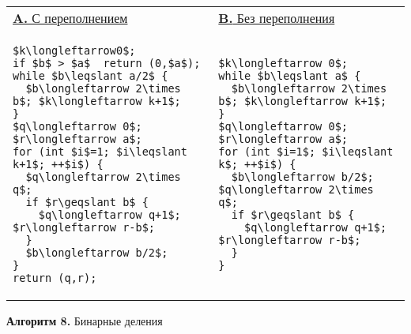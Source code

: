 \begin{center}
\begin{tabular}{|l|l|}
\hline
\hspace*{28pt}\underline{\textbf{A.} С переполнением}
&
\hspace*{23pt}\underline{\textbf{B.} Без переполнения}\\
{\begin{lstlisting}[mathescape=true, frame=none]
$k\longleftarrow0$;
if $b$ > $a$  return (0,$a$);
while $b\leqslant a/2$ {
  $b\longleftarrow 2\times b$; $k\longleftarrow k+1$;
}
$q\longleftarrow 0$; $r\longleftarrow a$;
for (int $i$=1; $i\leqslant k+1$; ++$i$) {
  $q\longleftarrow 2\times q$;
  if $r\geqslant b$ {
    $q\longleftarrow q+1$; $r\longleftarrow r-b$;
  }
  $b\longleftarrow b/2$;
}
return (q,r);
\end{lstlisting}}
&
{\begin{lstlisting}[mathescape=true, frame=none]
$k\longleftarrow 0$;
while $b\leqslant a$ {
  $b\longleftarrow 2\times b$; $k\longleftarrow k+1$;
}
$q\longleftarrow 0$; $r\longleftarrow a$;
for (int $i=1$; $i\leqslant k$; ++$i$) {
  $b\longleftarrow b/2$; $q\longleftarrow 2\times q$;
  if $r\geqslant b$ {
    $q\longleftarrow q+1$; $r\longleftarrow r-b$;
  }
}
\end{lstlisting}}\\
\hline
\end{tabular}
\end{center}
\begin{center}
\textbf{Алгоритм 8.} Бинарные деления
\end{center}
\newpage

